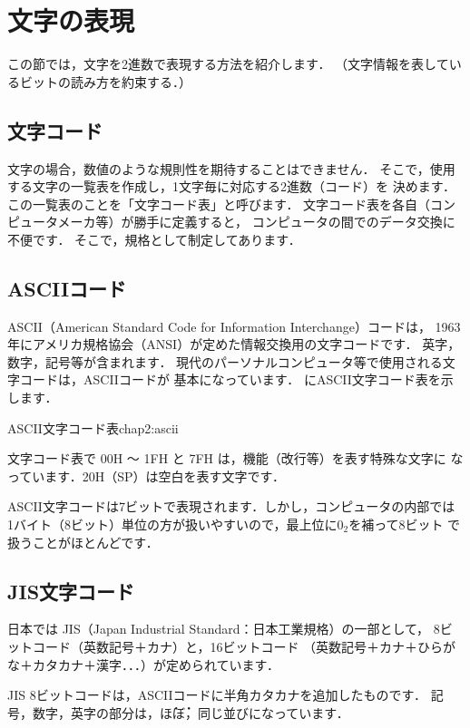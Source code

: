 \section{文字の表現}
\label{char}

この節では，文字を2進数で表現する方法を紹介します．
（文字情報を表しているビットの読み方を約束する．）

\subsection{文字コード}
文字の場合，数値のような規則性を期待することはできません．
そこで，使用する文字の一覧表を作成し，1文字毎に対応する2進数（コード）を
決めます．
この一覧表のことを「文字コード表」と呼びます．
文字コード表を各自（コンピュータメーカ等）が勝手に定義すると，
コンピュータの間でのデータ交換に不便です．
そこで，規格として制定してあります．

\subsection{ASCIIコード}
\label{ascii}
ASCII（American Standard Code for Information Interchange）コードは，
1963年にアメリカ規格協会（ANSI）が定めた情報交換用の文字コードです．
英字，数字，記号等が含まれます．
現代のパーソナルコンピュータ等で使用される文字コードは，ASCIIコードが
基本になっています．
にASCII文字コード表を示します．

          {ASCII文字コード表}{chap2:ascii}

文字コード表で 00H 〜 1FH と 7FH は，機能（改行等）を表す特殊な文字に
なっています．20H（SP）は空白を表す文字です．

ASCII文字コードは7ビットで表現されます．しかし，コンピュータの内部では
1バイト（8ビット）単位の方が扱いやすいので，最上位に$0_2$を補って8ビット
で扱うことがほとんどです．

\subsection{JIS文字コード}
日本では JIS（Japan Industrial Standard：日本工業規格）の一部として，
8ビットコード（英数記号＋カナ）と，16ビットコード
（英数記号＋カナ＋ひらがな＋カタカナ＋漢字．．．）が定められています．

JIS 8ビットコードは，ASCIIコードに半角カタカナを追加したものです．
記号，数字，英字の部分は，\.ほ\.ぼ，同じ並びになっています．

